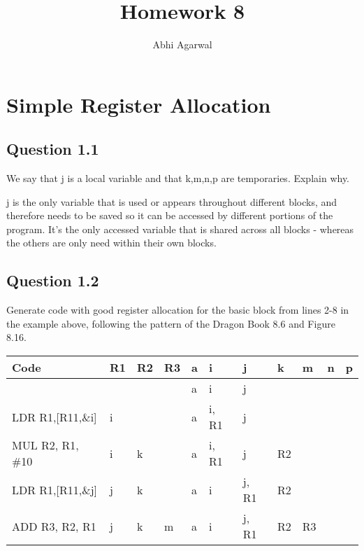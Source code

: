 \documentclass[11pt, oneside]{article}   	%
\title{Homework 8}
\author{Abhi Agarwal}
\date{}
\begin{document}
\maketitle

\section{Simple Register Allocation}

\subsection*{Question 1.1} 
\par We say that j is a local variable and that k,m,n,p are temporaries. Explain why.
\par j is the only variable that is used or appears throughout different blocks, and therefore needs to be saved so it can be accessed by different portions of the program. It's the only accessed variable that is shared across all blocks - whereas the others are only need within their own blocks. 

\subsection*{Question 1.2}
\par Generate code with good register allocation for the basic block from lines 2-8 in the example above, following the pattern of the Dragon Book 8.6 and Figure 8.16.

\begin{center}
    \begin{tabular}{| l | l | l | l | l | l | l | l | l | l | l |}
    \hline
    Code & R1 & R2 & R3 & a & i & j & k & m & n & p \\ \hline
    & & & & a & i & j & & & & \\ \hline
    LDR R1,[R11,\&i] & i & & & a & i, R1 & j & & & & \\ \hline
    MUL R2, R1, \#10 & i & k & & a & i, R1 & j & R2 & & & \\ \hline
    LDR R1,[R11,\&j] & j & k & & a & i & j, R1 & R2 & & & \\ \hline
    ADD R3, R2, R1 & j & k & m & a & i & j, R1 & R2 & R3 & & \\ \hline
    \end{tabular}
\end{center}
\end{document}
